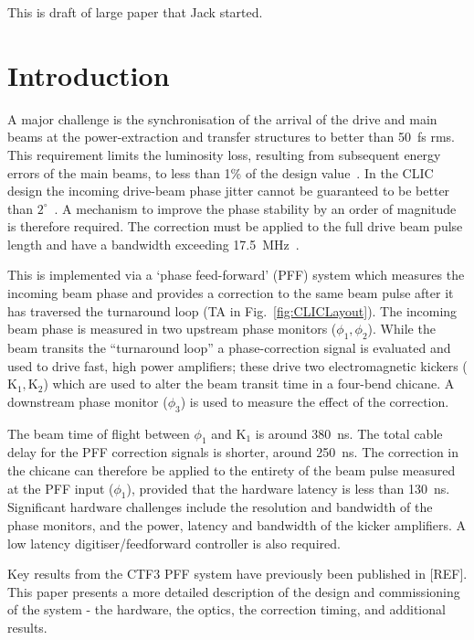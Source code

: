This is draft of large paper that Jack started.

\section{\label{sec.PFF_Intro}Introduction}

A major challenge is the synchronisation of the arrival of the drive and main 
beams at the power-extraction and transfer structures to better than 50~fs rms. 
This requirement limits the luminosity loss, resulting from subsequent 
energy errors of the main beams, to less than 1\% of the design 
value~\cite{clicLumEq}.
In the CLIC design the incoming drive-beam phase jitter 
cannot be guaranteed to be better than \(2^\circ\)~\cite{CLICCDR}.
A mechanism 
to improve the phase stability by an order of magnitude is 
therefore required. The correction must be applied to the full drive beam pulse 
length and have a bandwidth exceeding 17.5~MHz~\cite{Gerber2015}. 

This is implemented via a `phase feed-forward' (PFF) system which measures the 
incoming beam phase and provides a correction to the same beam pulse 
after it has traversed the turnaround loop (TA in Fig.~\ref{fig:CLICLayout}). 
The incoming beam phase is measured in two upstream phase 
monitors (\(\phi_{1}, \phi_{2}\)). While the beam 
transits the ``turnaround loop'' a phase-correction signal is evaluated and used 
to drive fast, high power amplifiers; these drive two electromagnetic kickers 
(\(\mathrm{K_1, K_2}\)) which are used to alter the beam transit time in a 
four-bend chicane. A downstream phase monitor (\(\phi_{3}\)) is 
used to measure the effect of the correction. 

The beam time of flight between \(\phi_1\) and \(\mathrm{K_1}\) is around 
380~ns. The total cable delay for the PFF correction signals 
is shorter, around 250~ns. The correction in the chicane can therefore be 
applied to the entirety of the beam pulse measured at the PFF input 
(\(\phi_1\)), provided that the hardware latency is less than 130~ns. 
Significant hardware challenges include the resolution and bandwidth of the 
phase monitors, and the power, latency and bandwidth of the kicker amplifiers. 
A low latency digitiser/feedforward controller is also required.

Key results from the CTF3 PFF system have previously been published in [REF]. 
This paper presents a more detailed description of the design and commissioning 
of the system - the hardware, the optics, the correction timing, and additional 
results.

